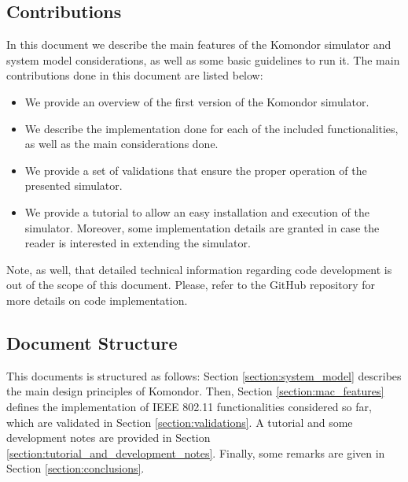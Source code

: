 \documentclass[a4paper]{article}
\newcommand{\sergio}[1]{\textcolor{brown}{#1}}
\newcommand{\sergiost}[1]{\textcolor{brown}{\st{#1}}}
\begin{document}
	\subsection{Contributions}
	In this document we describe the main features of the Komondor simulator and system model considerations, as well as some basic guidelines to run it. The main contributions done in this document are listed below:
	\begin{itemize}
		\item We provide an overview of the first version of the Komondor simulator.
		\item We describe the implementation done for each of the included functionalities, as well as the main considerations done.
		\item We provide a set of validations that ensure the proper operation of the presented simulator.
		\item We provide a tutorial to allow an easy installation and execution of the simulator. Moreover, some implementation details are granted in case the reader is interested in extending the simulator.
	\end{itemize}	
	
	Note, as well, that detailed technical information regarding code development is out of the scope of this document. Please, refer to the GitHub repository for more details on code implementation.
	
	\subsection{Document Structure}
	\label{section:structure}
	This documents is structured as follows: Section \ref{section:system_model} describes the main design principles of Komondor. Then, Section \ref{section:mac_features} defines the implementation of IEEE 802.11 functionalities considered so far, which are validated in Section \ref{section:validations}. A tutorial and some development notes are provided in Section \ref{section:tutorial_and_development_notes}. Finally, some remarks are given in Section \ref{section:conclusions}.
	
\end{document}
